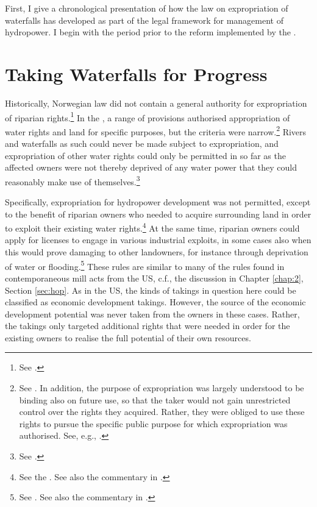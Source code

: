 First, I give a chronological presentation of how the law on expropriation of waterfalls has developed as part of the legal framework for management of hydropower. I begin with the period prior to the reform implemented by the \cite{ea90}.

\section{Taking Waterfalls for Progress}\label{sec:twp}

Historically, Norwegian law did not contain a general authority for expropriation of riparian rights.\footnote{See \cite[29]{amundsen28}.} In the \cite{wra88}, a range of provisions authorised appropriation of water rights and land for specific purposes, but the criteria were narrow.\footnote{See \cite[69-85]{dahl88}. In addition, the purpose of expropriation was largely understood to be binding also on future use, so that the taker would not gain unrestricted control over the rights they acquired. Rather, they were obliged to use these rights to pursue the specific public purpose for which expropriation was authorised. See, e.g., \cite[133-140]{rygh12}.} Rivers and waterfalls as such could never be made subject to expropriation, and expropriation of other water rights could only be permitted in so far as the affected owners were not thereby deprived of any water power that they could reasonably make use of themselves.\footnote{See \cite[58,60]{dahl88}.}

Specifically, expropriation for hydropower development was not permitted, except to the benefit of riparian owners who needed to acquire surrounding land in order to exploit their existing water rights.\footnote{See the \cite[15-16]{wra88}. See also the commentary in \cite[60-65]{dahl88}.} At the same time, riparian owners could apply for licenses to engage in various industrial exploits, in some cases also when this would prove damaging to other landowners, for instance through deprivation of water or flooding.\footnote{See \cite[14]{wra88}. See also the commentary in \cite[54-60]{dahl88}.} These rules are similar to many of the rules found in contemporaneous mill acts from the US, c.f., the discussion in Chapter \ref{chap:2}, Section \ref{sec:hop}. As in the US, the kinds of takings in question here could be classified as economic development takings. However, the source of the economic development potential was never taken from the owners in these cases. Rather, the takings only targeted additional rights that were needed in order for the existing owners to realise the full potential of their own resources.

